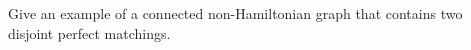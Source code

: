\question Give an example of a connected non-Hamiltonian graph that contains two
disjoint perfect matchings.
